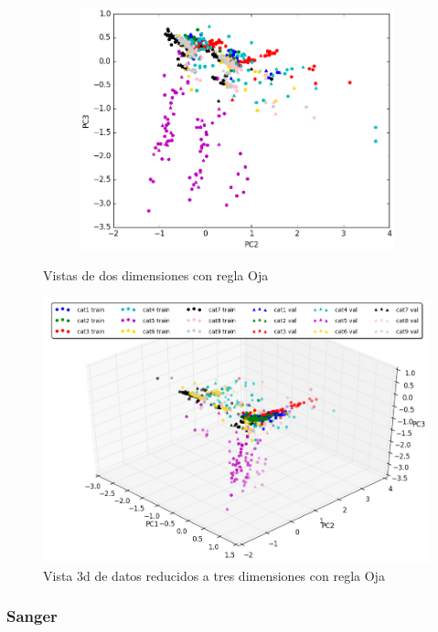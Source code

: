 \begin{figure}[ht!]	
	~\centering
	\begin{subfigure}[b]{0.5\textwidth}
		\includegraphics[width=\linewidth]{img/oja/3dim-pc2-pc3.png}
	\end{subfigure}%
	\caption{Vistas de dos dimensiones con regla Oja}
\end{figure}

\begin{figure}[ht!]
	\centering
	\includegraphics[width=0.8\linewidth]{img/parte1-vista3d-oja.png}

	\caption{Vista 3d de datos reducidos a tres dimensiones con regla Oja}
\end{figure}

\newpage
\subsubsection{Sanger}




